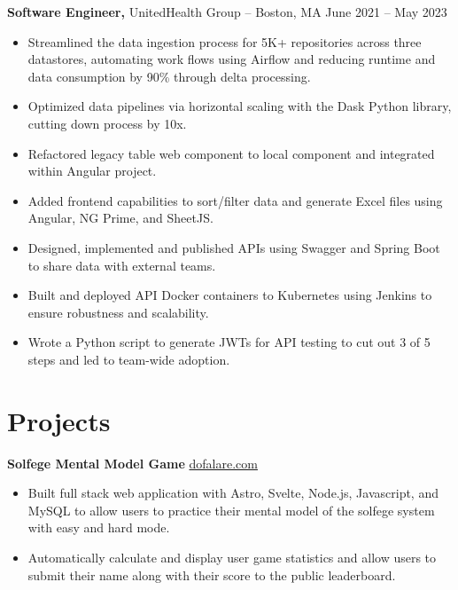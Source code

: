 \documentclass[11pt]{article}       %
\begin{document}
\textbf{Software Engineer,} {UnitedHealth Group} -- Boston, MA \hfill June 2021 -- May 2023 \\
\vspace{-9pt}
\begin{itemize}
  \item Streamlined the data ingestion process for 5K+ repositories across three datastores, automating work flows using Airflow and reducing runtime and data consumption by 90\% through delta processing.
  \item Optimized data pipelines via horizontal scaling with the Dask Python library, cutting down process by 10x.
  \item Refactored legacy table web component to local component and integrated within Angular project.
  \item Added frontend capabilities to sort/filter data and generate Excel files using Angular, NG Prime, and SheetJS.
  \item Designed, implemented and published APIs using Swagger and Spring Boot to share data with external teams.
  \item Built and deployed API Docker containers to Kubernetes using Jenkins to ensure robustness and scalability.
  \item Wrote a Python script to generate JWTs for API testing to cut out 3 of 5 steps and led to team-wide adoption.
  
\end{itemize}


\vspace{-18.5pt}

\section*{Projects}
\textbf{Solfege Mental Model Game} \hfill \href{https://dofalare.com}{dofalare.com} \\
\vspace{-9pt}
\begin{itemize}
  \item Built full stack web application with Astro, Svelte, Node.js, Javascript, and MySQL to allow users to practice their mental model of the solfege system with easy and hard mode.
  \item Automatically calculate and display user game statistics and allow users to submit their name along with their score to the public leaderboard.
\end{itemize}
\end{document}
